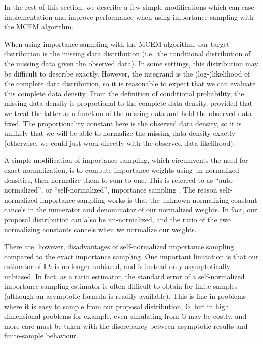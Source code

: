 \documentclass[ss]{imsart}
\theoremstyle{plain}
\theoremstyle{definition}
\theoremstyle{remark}
\newcommand{\bF}{\mathbb{F}}
\newcommand{\bG}{\mathbb{G}}
\begin{document}
In the rest of this section, we describe a few simple modifications which can ease implementation and improve performance when using importance sampling with the MCEM algorithm.

When using importance sampling with the MCEM algorithm, our target distribution is the missing data distribution (i.e.\ the conditional distribution of the missing data given the observed data). In some settings, this distribution may be difficult to describe exactly. However, the integrand is the (log-)likelihood of the complete data distribution, so it is reasonable to expect that we can evaluate this complete data density. From the definition of conditional probability, the missing data density is proportional to the complete data density, provided that we treat the latter as a function of the missing data and hold the observed data fixed. The proportionality constant here is the observed data density, so it is unlikely that we will be able to normalize the missing data density exactly (otherwise, we could just work directly with the observed data likelihood). 

A simple modification of importance sampling, which circumvents the need for exact normalization, is to compute importance weights using un-normalized densities, then normalize them to sum to one. This is referred to as ``auto-normalized'', or ``self-normalized'', importance sampling \citep[see, e.g.,][]{Elv22}. The reason self-normalized importance sampling works is that the unknown normalizing constant cancels in the numerator and denominator of our normalized weights. In fact, our proposal distribution can also be un-normalized, and the ratio of the two normalizing constants cancels when we normalize our weights.

There are, however, disadvantages of self-normalized importance sampling compared to the exact importance sampling. One important limitation is that our estimator of $\bF h$ is no longer unbiased, and is instead only asymptotically unbiased. In fact, as a ratio estimator, the standard error of a self-normalized importance sampling estimator is often difficult to obtain for finite samples (although an asymptotic formula is readily available). This is fine in problems where it is easy to sample from our proposal distribution, $\bG$, but in high dimensional problems for example, even simulating from $\bG$ may be costly, and more care must be taken with the discrepancy between asymptotic results and finite-sample behaviour.
\end{document}

